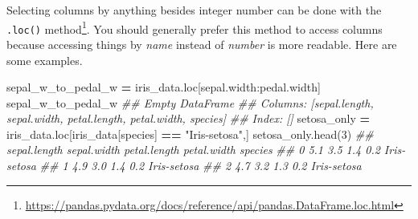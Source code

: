 \documentclass[
  12pt,
  krantz2]{krantz}
\makeatletter
\newenvironment{Shaded}{\begin{snugshade}}{\end{snugshade}}
\newcommand{\CommentTok}[1]{\textcolor[rgb]{0.37,0.37,0.37}{\textit{#1}}}
\newcommand{\DecValTok}[1]{\textcolor[rgb]{0.06,0.06,0.06}{#1}}
\newcommand{\NormalTok}[1]{#1}
\newcommand{\OperatorTok}[1]{\textcolor[rgb]{0.43,0.43,0.43}{\textbf{#1}}}
\newcommand{\StringTok}[1]{\textcolor[rgb]{0.5,0.5,0.5}{#1}}
\renewcommand{\href}[2]{#2\footnote{\url{#1}}}
\newenvironment{kframe}{%
\medskip{}
\setlength{\fboxsep}{.8em}
 \def\at@end@of@kframe{}%
 \ifinner\ifhmode%
  \def\at@end@of@kframe{\end{minipage}}%
  \begin{minipage}{\columnwidth}%
 \fi\fi%
 \def\FrameCommand##1{\hskip\@totalleftmargin \hskip-\fboxsep
 \colorbox{shadecolor}{##1}\hskip-\fboxsep
     \hskip-\linewidth \hskip-\@totalleftmargin \hskip\columnwidth}%
 \MakeFramed {\advance\hsize-\width
   \@totalleftmargin\z@ \linewidth\hsize
   \@setminipage}}%
 {\par\unskip\endMakeFramed%
 \at@end@of@kframe}
\renewenvironment{Shaded}{\begin{kframe}}{\end{kframe}}
\makeatother
\begin{document}
\begin{Shaded}
\end{Shaded}

Selecting columns by anything besides integer number can be done with the \href{https://pandas.pydata.org/docs/reference/api/pandas.DataFrame.loc.html}{\texttt{.loc()} method}. You should generally prefer this method to access columns because accessing things by \emph{name} instead of \emph{number} is more readable. Here are some examples.

\begin{Shaded}
\begin{Highlighting}[]
\NormalTok{sepal\_w\_to\_pedal\_w }\OperatorTok{=}\NormalTok{ iris\_data.loc[}\StringTok{\textquotesingle{}sepal.width\textquotesingle{}}\NormalTok{:}\StringTok{\textquotesingle{}pedal.width\textquotesingle{}}\NormalTok{]}
\NormalTok{sepal\_w\_to\_pedal\_w}
\CommentTok{\#\# Empty DataFrame}
\CommentTok{\#\# Columns: [sepal.length, sepal.width, petal.length, petal.width, species]}
\CommentTok{\#\# Index: []}
\NormalTok{setosa\_only }\OperatorTok{=}\NormalTok{ iris\_data.loc[iris\_data[}\StringTok{\textquotesingle{}species\textquotesingle{}}\NormalTok{] }\OperatorTok{==} \StringTok{"Iris{-}setosa"}\NormalTok{,]}
\NormalTok{setosa\_only.head(}\DecValTok{3}\NormalTok{)}
\CommentTok{\#\#    sepal.length  sepal.width  petal.length  petal.width      species}
\CommentTok{\#\# 0           5.1          3.5           1.4          0.2  Iris{-}setosa}
\CommentTok{\#\# 1           4.9          3.0           1.4          0.2  Iris{-}setosa}
\CommentTok{\#\# 2           4.7          3.2           1.3          0.2  Iris{-}setosa}
\end{Highlighting}
\end{Shaded}
\end{document}
